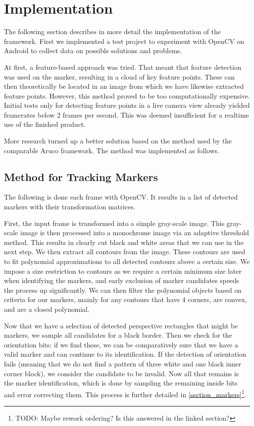 \section{Implementation}

The following section describes in more detail the implementation of the framework.
First we implemented a test project to experiment with OpenCV on Android to collect data on possible solutions and problems.

At first, a feature-based approach was tried.
That meant that feature detection was used on the marker, resulting in a cloud of key feature points.
These can then theoretically be located in an image from which we have likewise extracted feature points.
However, this method proved to be too computationally expensive.
Initial tests only for detecting feature points in a live camera view already yielded framerates below 2 frames per second.
This was deemed insufficient for a realtime use of the finished product.

More research turned up a better solution based on the method used by the comparable Aruco\cite{aruco} framework.
The method was implemented as follows.

\subsection{Method for Tracking Markers}

The following is done each frame with OpenCV.
It results in a list of detected markers with their transformation matrices.

First, the input frame is transformed into a simple gray-scale image.
This gray-scale image is then processed into a monochrome image via an adaptive threshold method.
This results in clearly cut black and white areas that we can use in the next step.
We then extract all contours from the image.
These contours are used to fit polynomial approximations to all detected contours above a certain size.
We impose a size restriction to contours as we require a certain minimum size later when identifying the markers, and early exclusion of marker candidates speeds the process up significantly.
We can then filter the polynomial objects based on criteria for our markers, mainly for any contours that have 4 corners, are convex, and are a closed polynomial.

Now that we have a selection of detected perspective rectangles that might be markers, we sample all candidates for a black border.
Then we check for the orientation bits: if we find these, we can be comparatively sure that we have a valid marker and can continue to its identification.
If the detection of orientation fails (meaning that we do not find a pattern of three white and one black inner corner block), we consider the candidate to be invalid.
Now all that remains is the marker identification, which is done by sampling the remaining inside bits and error correcting them.
This process is further detailed in \ref{section_markers}\footnote{TODO: Maybe rework ordering? Is this answered in the linked section?}.

